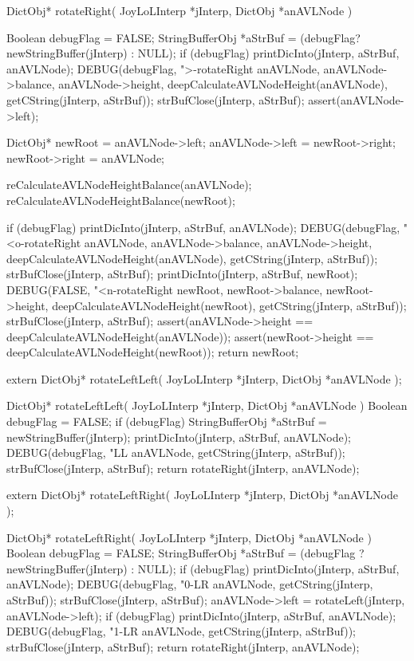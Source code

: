 \startCCode
DictObj* rotateRight(
  JoyLoLInterp *jInterp,
  DictObj      *anAVLNode
) {
  Boolean debugFlag = FALSE;
  StringBufferObj *aStrBuf =
    (debugFlag? newStringBuffer(jInterp) : NULL);
  if (debugFlag) {
    printDicInto(jInterp, aStrBuf, anAVLNode);
    DEBUG(debugFlag, ">-rotateRight %
          anAVLNode, anAVLNode->balance, anAVLNode->height,
          deepCalculateAVLNodeHeight(anAVLNode),
          getCString(jInterp, aStrBuf));
    strBufClose(jInterp, aStrBuf);
  }
  assert(anAVLNode->left);

  DictObj* newRoot = anAVLNode->left;
  anAVLNode->left = newRoot->right;
  newRoot->right  = anAVLNode;

  reCalculateAVLNodeHeightBalance(anAVLNode);
  reCalculateAVLNodeHeightBalance(newRoot);

  if (debugFlag) {
    printDicInto(jInterp, aStrBuf, anAVLNode);
    DEBUG(debugFlag, "<o-rotateRight %
          anAVLNode, anAVLNode->balance, anAVLNode->height,
          deepCalculateAVLNodeHeight(anAVLNode),
          getCString(jInterp, aStrBuf));
    strBufClose(jInterp, aStrBuf);
    printDicInto(jInterp, aStrBuf, newRoot);
    DEBUG(FALSE, "<n-rotateRight %
          newRoot, newRoot->balance, newRoot->height,
          deepCalculateAVLNodeHeight(newRoot),
          getCString(jInterp, aStrBuf));
    strBufClose(jInterp, aStrBuf);
  }
  assert(anAVLNode->height == deepCalculateAVLNodeHeight(anAVLNode));
  assert(newRoot->height == deepCalculateAVLNodeHeight(newRoot));
  return newRoot;
}
\stopCCode

\startCHeader
extern DictObj* rotateLeftLeft(
  JoyLoLInterp *jInterp,
  DictObj      *anAVLNode
);
\stopCHeader

\startCCode
DictObj* rotateLeftLeft(
  JoyLoLInterp *jInterp,
  DictObj      *anAVLNode
) {
  Boolean debugFlag = FALSE;
  if (debugFlag) {
    StringBufferObj *aStrBuf = newStringBuffer(jInterp);
    printDicInto(jInterp, aStrBuf, anAVLNode);
    DEBUG(debugFlag, "LL %
      anAVLNode, getCString(jInterp, aStrBuf));
    strBufClose(jInterp, aStrBuf);
  }
  return rotateRight(jInterp, anAVLNode);
}
\stopCCode

\startCHeader
extern DictObj* rotateLeftRight(
  JoyLoLInterp *jInterp,
  DictObj      *anAVLNode
);
\stopCHeader

\startCCode
DictObj* rotateLeftRight(
  JoyLoLInterp *jInterp,
  DictObj      *anAVLNode
) {
  Boolean debugFlag = FALSE;
  StringBufferObj *aStrBuf =
    (debugFlag ? newStringBuffer(jInterp) : NULL);
  if (debugFlag) {
    printDicInto(jInterp, aStrBuf, anAVLNode);
    DEBUG(debugFlag, "0-LR %
      anAVLNode, getCString(jInterp, aStrBuf));
    strBufClose(jInterp, aStrBuf);
  }
  anAVLNode->left = rotateLeft(jInterp, anAVLNode->left);
  if (debugFlag) {
    printDicInto(jInterp, aStrBuf, anAVLNode);
    DEBUG(debugFlag, "1-LR %
      anAVLNode, getCString(jInterp, aStrBuf));
    strBufClose(jInterp, aStrBuf);
  }
  return rotateRight(jInterp, anAVLNode);
}
\stopCCode

